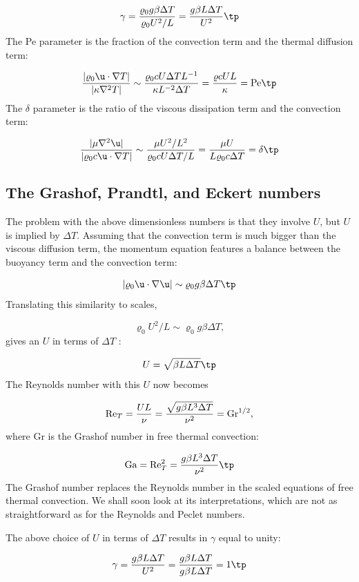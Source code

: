 \documentclass[graybox,envcountchap,sectrefs,final]{svmonodo}
\begin{document}
\[ \gamma = \frac{\varrho_0 g\beta \Delta T }{\varrho_0 U^2/L}
= \frac{g\beta L\Delta T }{U^2}\tp\]
The Pe parameter is the fraction of the convection term
and the thermal diffusion term:

\[ \frac{|\varrho_0\u\cdot\nabla T|}{|\kappa\nabla^2 T|}\sim
\frac{\varrho_0 c U \Delta T L^{-1}}{\kappa L^{-2}\Delta T}
= \frac{\varrho c UL}{\kappa } = \hbox{Pe}\tp\]
The $\delta$ parameter is the ratio of the viscous dissipation term
and the convection term:

\[ \frac{|\mu\nabla^2\u|}{|\varrho_0c\u\cdot\nabla T|}\sim
\frac{\mu U^2/L^2}{\varrho_0 c U \Delta T/L} =
\frac{\mu U}{L\varrho_0 c \Delta T} = \delta\tp
\]

\subsection{The Grashof, Prandtl, and Eckert numbers}


The problem with the above dimensionless numbers is that they involve
$U$, but $U$ is implied by $\Delta T$. Assuming that the convection
term is much bigger than the viscous diffusion term, the momentum
equation features a balance between the buoyancy term and the convection
term:

\[ |\varrho_0 \u\cdot\nabla\u| \sim \varrho_0 g \beta\Delta T\tp\]
Translating this similarity to scales,

\[ \varrho_0 U^2/L \sim \varrho_0 g \beta\Delta T,\]
gives an $U$ in terms of $\Delta T$ :

\[ U = \sqrt{\beta L \Delta T}\tp\]
The Reynolds number with this $U$ now becomes

\[ \hbox{Re}_T = \frac{UL}{\nu} = \frac{\sqrt{g\beta L^3 \Delta T}}{\nu^2}
= \hbox{Gr}^{1/2},\]
where Gr is the Grashof number in free thermal convection:

\[ \hbox{Ga} = \hbox{Re}_T^2 =  \frac{g\beta L^3 \Delta T}{\nu^2}\tp\]
The Grashof number replaces the Reynolds number in the scaled equations
of free thermal convection. We shall soon look at its interpretations,
which are not as straightforward as for the Reynolds and Peclet numbers.

The above
choice of $U$ in terms of $\Delta T$ results in $\gamma$ equal to unity:

\[ \gamma = \frac{g\beta L\Delta T }{U^2} =
\frac{g\beta L\Delta T }{g\beta L \Delta T} = 1\tp\]

\end{document}
